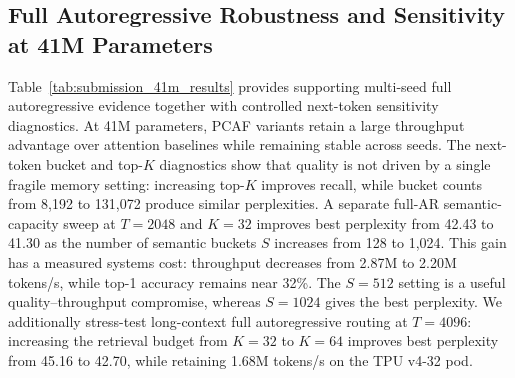 \documentclass{article}
\begin{document}
\subsection{Full Autoregressive Robustness and Sensitivity at 41M Parameters}

Table~\ref{tab:submission_41m_results} provides supporting multi-seed full
autoregressive evidence together with controlled next-token sensitivity
diagnostics. At 41M parameters, PCAF variants retain a large throughput
advantage over attention baselines while remaining stable across seeds. The
next-token bucket and top-$K$ diagnostics show that quality is not driven by a
single fragile memory setting: increasing top-$K$ improves recall, while bucket
counts from 8,192 to 131,072 produce similar perplexities. A separate full-AR
semantic-capacity sweep at $T=2048$ and $K=32$ improves best perplexity from
42.43 to 41.30 as the number of semantic buckets $S$ increases from 128 to
1,024. This gain has a measured systems cost: throughput decreases from 2.87M
to 2.20M tokens/s, while top-1 accuracy remains near 32\%. The $S=512$ setting
is a useful quality--throughput compromise, whereas $S=1024$ gives the best
perplexity. We additionally stress-test long-context full autoregressive
routing at $T=4096$: increasing the retrieval budget from $K=32$ to $K=64$
improves best perplexity from 45.16 to 42.70, while retaining 1.68M tokens/s
on the TPU v4-32 pod.
\end{document}
